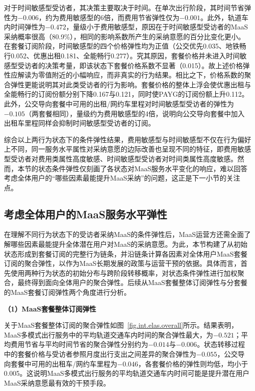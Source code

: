 对于时间敏感型受访者，其决策主要取决于时间。在单次出行阶段，其时间节省弹性为$-0.006$，约为费用敏感型的6倍，而费用节省弹性仅为$-0.001$。此外，轨道车内时间弹性为$-0.472$，量级小于费用敏感型，原因在于时间敏感型受访者的MaaS采纳概率很高（80.9\%），相同的影响系数所产生的采纳意愿的百分比变化更小。在套餐订阅阶段，时间敏感型的四个价格弹性均为正值（公交优先0.035、地铁畅行0.052、优惠出租0.181、全能畅行0.277）。究其原因，套餐价格并未进入时间敏感型受访者的决策考量，即该状态下套餐价格系数不显著（0.015）。故上述价格弹性应解读为零值附近的小幅响应，而非真实的行为结果。相比之下，价格系数的聚合弹性更能说明其对此类受访者的行为影响。套餐价格的整体上浮会使优惠出租与全能畅行的订阅份额分别下降0.167与0.121，同时使PAYG的订阅份额上升0.112。此外，公交导向套餐中可用的出租/网约车里程对时间敏感型受访者的弹性为$-0.105$（两套餐相同），量级约为费用敏感型的4倍，说明向公交导向套餐中加入出租车里程同样会抑制时间敏感型受访者的订阅。

综合以上两行为状态下的条件弹性结果，费用敏感型与时间敏感型不仅在行为偏好上不同，同一服务水平属性对采纳意愿的边际改善也呈现不同的特征，即费用敏感型受访者对费用类属性高度敏感、时间敏感型受访者对时间类属性高度敏感。然而，本节的状态条件弹性仅刻画了各状态对MaaS服务水平变化的响应，难以回答考虑全体用户的``哪些因素最能提升MaaS采纳''的问题，这正是下一小节的关注点。

\subsection{考虑全体用户的MaaS服务水平弹性}\label{subsec.int.disc.driver}

在理解不同行为状态下的受访者采纳MaaS的条件弹性后，MaaS运营方还需全面了解哪些因素最能提升全体潜在用户对MaaS的采纳意愿。为此，本节构建了从初始状态形成到套餐订阅的完整行为链条，并沿链条计算各因素对全体用户MaaS套餐订阅的聚合弹性，以作为MaaS长期发展的政策与运营干预的依据。具体而言，首先使用两种行为状态的初始分布与跨阶段转移概率，对状态条件弹性进行加权聚合，最终得到面向全体用户的聚合弹性。后续从MaaS套餐整体订阅弹性与分套餐的MaaS套餐订阅弹性两个角度进行分析。

\textbf{（1）MaaS套餐整体订阅弹性}

关于MaaS套餐整体订阅的聚合弹性如图~\ref{fig.int.elas.overall}所示。结果表明，MaaS多模式出行服务中的平均轨道交通车内时间的聚合弹性最大，为$-0.521$；平均费用节省与平均时间节省的聚合弹性分别约为$-0.014$与$-0.006$。状态转移过程中的套餐价格与受访者参照月度出行支出之间差异的聚合弹性为$-0.055$，公交导向套餐中可用的出租车/网约车里程为$-0.046$，各套餐价格的弹性则均低，均小于0.005。这说明MaaS多模式出行服务的平均轨道交通车内时间可能是提升潜在用户MaaS采纳意愿最有效的干预手段。

